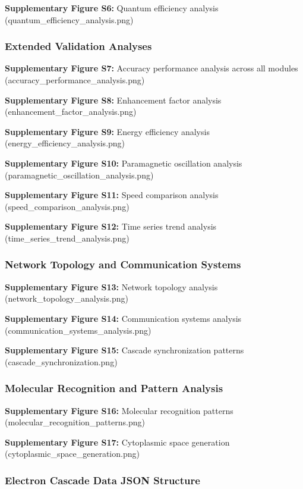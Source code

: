 \textbf{Supplementary Figure S6:} Quantum efficiency analysis (quantum\_efficiency\_analysis.png)

\subsubsection{Extended Validation Analyses}

\textbf{Supplementary Figure S7:} Accuracy performance analysis across all modules (accuracy\_performance\_analysis.png)

\textbf{Supplementary Figure S8:} Enhancement factor analysis (enhancement\_factor\_analysis.png)

\textbf{Supplementary Figure S9:} Energy efficiency analysis (energy\_efficiency\_analysis.png)

\textbf{Supplementary Figure S10:} Paramagnetic oscillation analysis (paramagnetic\_oscillation\_analysis.png)

\textbf{Supplementary Figure S11:} Speed comparison analysis (speed\_comparison\_analysis.png)

\textbf{Supplementary Figure S12:} Time series trend analysis (time\_series\_trend\_analysis.png)

\subsubsection{Network Topology and Communication Systems}

\textbf{Supplementary Figure S13:} Network topology analysis (network\_topology\_analysis.png)

\textbf{Supplementary Figure S14:} Communication systems analysis (communication\_systems\_analysis.png)

\textbf{Supplementary Figure S15:} Cascade synchronization patterns (cascade\_synchronization.png)

\subsubsection{Molecular Recognition and Pattern Analysis}

\textbf{Supplementary Figure S16:} Molecular recognition patterns (molecular\_recognition\_patterns.png)

\textbf{Supplementary Figure S17:} Cytoplasmic space generation (cytoplasmic\_space\_generation.png)

\subsubsection{Electron Cascade Data JSON Structure}

